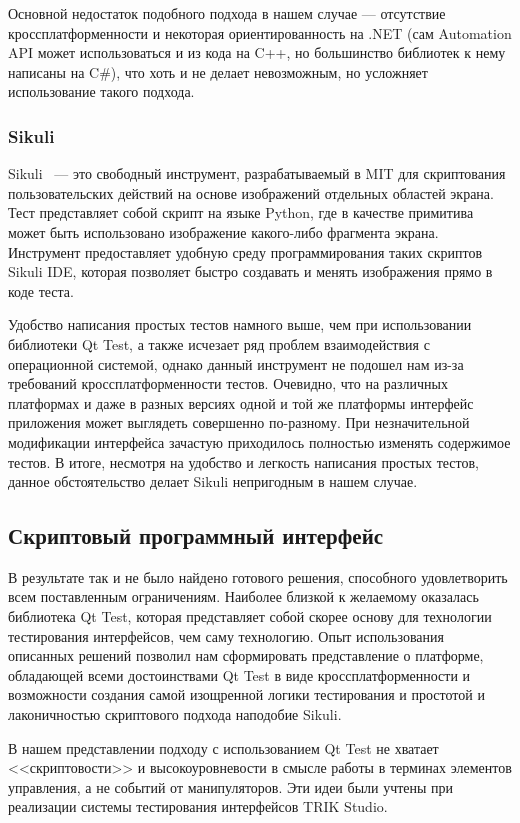 \documentclass[conference]{IEEEtran}
\begin{document}
Основной недостаток подобного подхода в нашем случае --- отсутствие кроссплатформенности и некоторая ориентированность 
на .NET (сам Automation API может использоваться и из кода на C++, но большинство библиотек к нему написаны на C\#), 
что хоть и не делает невозможным, но усложняет использование такого подхода.

\subsubsection{Sikuli}
Sikuli~\cite{yen2009sikuli} --- это свободный инструмент, разрабатываемый в MIT для скриптования пользовательских действий на 
основе изображений отдельных областей экрана. Тест представляет собой скрипт на языке Python, где в качестве 
примитива может быть использовано изображение какого-либо фрагмента экрана. Инструмент предоставляет удобную 
среду программирования таких скриптов Sikuli IDE, которая позволяет быстро создавать и менять изображения прямо в коде теста.

Удобство написания простых тестов намного выше, чем при использовании библиотеки Qt Test, а также исчезает 
ряд проблем взаимодействия с операционной системой, однако данный инструмент не подошел нам из-за требований 
кроссплатформенности тестов. Очевидно, что на различных платформах и даже в разных версиях одной и той же 
платформы интерфейс приложения может выглядеть совершенно по-разному. При незначительной модификации интерфейса 
зачастую приходилось полностью изменять содержимое тестов. В итоге, несмотря на удобство и легкость написания 
простых тестов, данное обстоятельство делает Sikuli непригодным в нашем случае.

\subsection{Скриптовый программный интерфейс}
\label{part:scriptApi}
В результате так и не было найдено готового решения, способного удовлетворить всем поставленным ограничениям. 
Наиболее близкой к желаемому оказалась библиотека Qt Test, которая представляет собой скорее основу для
технологии тестирования интерфейсов, чем саму технологию. Опыт использования описанных решений позволил 
нам сформировать представление о платформе, обладающей всеми достоинствами Qt Test в виде кроссплатформенности 
и возможности создания самой изощренной логики тестирования и простотой и лаконичностью скриптового подхода наподобие Sikuli.

В нашем представлении подходу с использованием Qt Test не хватает <<скриптовости>> и высокоуровневости 
в смысле работы в терминах элементов управления, а не событий от манипуляторов. Эти идеи были учтены при 
реализации системы тестирования интерфейсов TRIK Studio.
\end{document}
